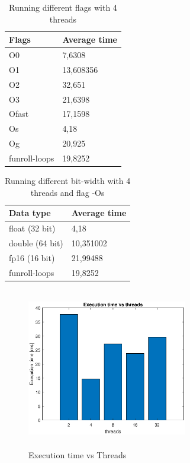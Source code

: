 \documentclass[twocolumn]{article}
\begin{document}
\begin{table}[!ht]
    \centering
    \caption{Running different flags with 4 threads}
    \begin{tabular}{|l|l|}
    \hline
        Flags & Average time \\ \hline
        O0 & 7,6308 \\ \hline
        O1 & 13,608356 \\ \hline
        O2 & 32,651 \\ \hline
        O3 & 21,6398 \\ \hline
        Ofast & 17,1598 \\ \hline
        Os & 4,18 \\ \hline
        Og & 20,925 \\ \hline
        funroll-loops & 19,8252 \\ \hline
    \end{tabular}
    \label{Table 2}
\end{table}

\begin{table}[!ht]
    \centering
    \caption{Running different bit-width with 4 threads and flag -Os}
    \begin{tabular}{|l|l|}
    \hline
        Data type & Average time \\ \hline
        float (32 bit) & 4,18 \\ \hline
        double (64 bit) & 10,351002 \\ \hline
        fp16 (16 bit) & 21,99488 \\ \hline
        funroll-loops & 19,8252 \\ \hline
    \end{tabular}
    \label{Table 3}
\end{table}



\begin{figure}[!h]

    \centering

    \includegraphics[width = 7cm, height = 7cm]{graph1}

    \caption{Execution time vs Threads}

\end{figure}
\end{document}
